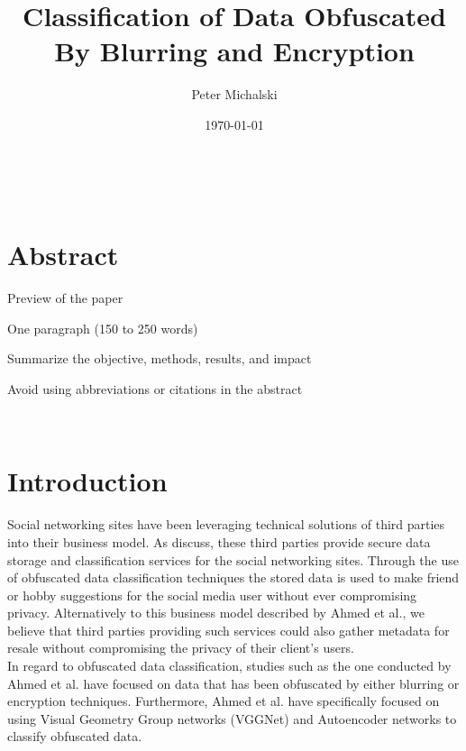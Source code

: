 \documentclass[12pt, titlepage]{article}
\begin{document}
\title{Classification of Data Obfuscated By Blurring and Encryption} 
\author{Peter Michalski}
\date{\today}

\maketitle

\newpage

\tableofcontents
{}

~\newpage
{}

\section{Abstract}

Preview of the paper

One paragraph (150 to 250 words)

Summarize the objective, methods, 
results, and impact

Avoid using abbreviations or citations 
in the abstract

~\newpage
\section{Introduction}

Social networking sites have been leveraging technical solutions of third parties into their business model. As \cite{ahmed2018obfuscated} discuss, these third parties provide secure data storage and classification services for the social networking sites. Through the use of obfuscated data classification techniques the stored data is used to make friend or hobby suggestions for the social media user without ever compromising privacy. Alternatively to this business model described by Ahmed et al., we believe that third parties providing such services could also gather metadata for resale without compromising the privacy of their client's users.\\

\noindent In regard to obfuscated data classification, studies such as the one conducted by Ahmed et al. have focused on data that has been obfuscated by either blurring or encryption techniques. Furthermore, Ahmed et al. have specifically focused on using Visual Geometry Group networks (VGGNet) and Autoencoder networks to classify obfuscated data.\\ 
\end{document}
